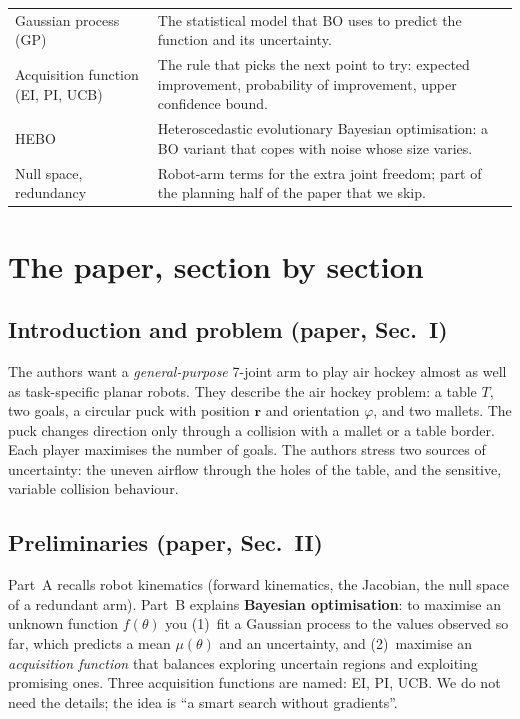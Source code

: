 \documentclass[11pt,a4paper]{article}
\begin{document}
\begin{center}
\begin{tabularx}{\textwidth}{@{}l X@{}}
Gaussian process (GP) & The statistical model that BO uses to predict the function and its uncertainty. \\
Acquisition function (EI, PI, UCB) & The rule that picks the next point to try: expected improvement, probability of improvement, upper confidence bound. \\
HEBO & Heteroscedastic evolutionary Bayesian optimisation: a BO variant that copes with noise whose size varies. \\
Null space, redundancy & Robot-arm terms for the extra joint freedom; part of the planning half of the paper that we skip. \\
\bottomrule
\end{tabularx}
\end{center}

\section{The paper, section by section}

\subsection{Introduction and problem (paper, Sec.~I)}
The authors want a \emph{general-purpose} 7-joint arm to play air hockey almost as well as
task-specific planar robots. They describe the air hockey problem: a table $T$, two goals, a
circular puck with position $\bm r$ and orientation $\varphi$, and two mallets. The puck changes
direction only through a collision with a mallet or a table border. Each player maximises the
number of goals. The authors stress two sources of uncertainty: the uneven airflow through the
holes of the table, and the sensitive, variable collision behaviour.

\subsection{Preliminaries (paper, Sec.~II)}
Part~A recalls robot kinematics (forward kinematics, the Jacobian, the null space of a redundant
arm). Part~B explains \textbf{Bayesian optimisation}: to maximise an unknown function $f(\theta)$ you
(1)~fit a Gaussian process to the values observed so far, which predicts a mean $\mu(\theta)$ and an
uncertainty, and (2)~maximise an \emph{acquisition function} that balances exploring uncertain
regions and exploiting promising ones. Three acquisition functions are named: EI, PI, UCB. We do not
need the details; the idea is ``a smart search without gradients''.
\end{document}
